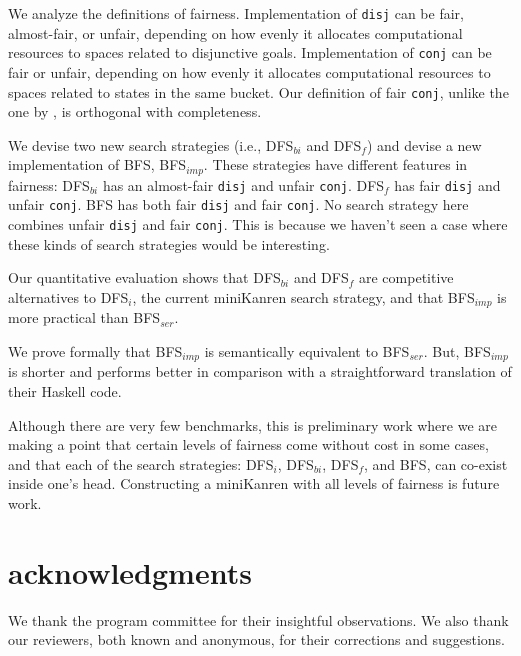 \documentclass[acmlarge]{acmart}
\newcommand{\conj}{\texttt{conj}}
\newcommand{\disj}{\texttt{disj}}
\newcommand{\DFSi }[0]{DFS$_{i}$}
\newcommand{\DFSf }[0]{DFS$_{f}$}
\newcommand{\DFSbi}[0]{DFS$_{bi}$}
\newcommand{\BFS}[0]{BFS}
\newcommand{\BFSser}[0]{BFS$_{ser}$}
\newcommand{\BFSimp}[0]{BFS$_{imp}$}
\begin{document}
We analyze the definitions of fairness. Implementation of \disj{} can be fair, 
almost-fair, or unfair, depending on how evenly it allocates computational 
resources to spaces related to disjunctive goals. Implementation of \conj{}
can be fair or unfair, depending on how evenly it allocates computational 
resources to spaces related to states in the same bucket. Our definition of 
fair \conj{}, unlike the one by \citet{seres1999algebra}, is orthogonal with 
completeness.


We devise two new search strategies (i.e., \DFSbi{} and \DFSf{}) and devise a 
new implementation of \BFS{}, \BFSimp{}. These strategies have different 
features in fairness: \DFSbi{} has an almost-fair \disj{} and unfair \conj{}. 
\DFSf{} has fair \disj{} and unfair \conj{}. \BFS{} has both fair
\disj{} and fair \conj{}. No search strategy here combines unfair 
\disj{} and fair \conj{}. This is because we haven't seen a case where these 
kinds of search strategies would be interesting.

Our quantitative evaluation shows that \DFSbi{} and \DFSf{} are competitive 
alternatives to \DFSi{}, the current miniKanren search strategy, and that 
\BFSimp{} is more practical than \BFSser{}.

We prove formally that \BFSimp{} is semantically equivalent to \BFSser{}. But, 
\BFSimp{} is shorter and performs better in comparison with a straightforward 
translation of their Haskell code.

Although there are very few benchmarks, this is preliminary work where we are 
making a point that certain levels of fairness come without cost in some cases, 
and that each of the search strategies: \DFSi, \DFSbi, \DFSf, and 
\BFS, can co-exist inside one's head. Constructing a miniKanren with all 
levels of fairness is future work.

\section*{acknowledgments}

We thank the program committee for their insightful observations. We also thank 
our reviewers, both known and anonymous, for their corrections and suggestions.



\end{document}
